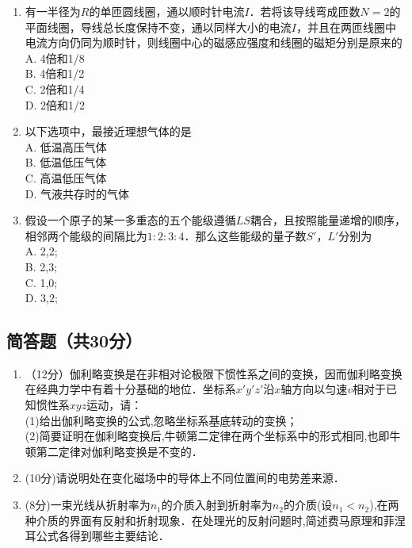\begin{enumerate}
\item 有一半径为$R$的单匝圆线圈，通以顺时针电流$I$．若将该导线弯成匝数$N=2$的平面线圈，导线总长度保持不变，通以同样大小的电流$I$，并且在两匝线圈中电流方向仍同为顺时针，则线圈中心的磁感应强度和线圈的磁矩分别是原来的\\
A. 4倍和1/8\\
B. 4倍和1/2\\
C. 2倍和1/4\\
D. 2倍和1/2\\

\item 以下选项中，最接近理想气体的是\\
A. 低温高压气体\\
B. 低温低压气体\\
C. 高温低压气体\\
D. 气液共存时的气体\\

\item 假设一个原子的某一多重态的五个能级遵循$LS$耦合，且按照能量递增的顺序，相邻两个能级的间隔比为$1:2:3:4$．那么这些能级的量子数$S'$，$L'$分别为\\
A. 2,2;\\
B. 2,3;\\
C. 1,0;\\
D. 3,2;\\
\end{enumerate}
\subsection{简答题（共30分）}
\begin{enumerate}
\item （12分）伽利略变换是在非相对论极限下惯性系之间的变换，因而伽利略变换在经典力学中有着十分基础的地位．坐标系$x'y'z'$沿$x$轴方向以匀速$v$相对于已知惯性系$xyz$运动，请：\\
(1)给出伽利略变换的公式,忽略坐标系基底转动的变换；\\
(2)简要证明在伽利略变换后,牛顿第二定律在两个坐标系中的形式相同,也即牛顿第二定律对伽利略变换是不变的．\\

\item (10分)请说明处在变化磁场中的导体上不同位置间的电势差来源．

\item (8分)一束光线从折射率为$n_{1}$的介质入射到折射率为$n_{2}$的介质(设$n_{1}<n_{2}$),在两种介质的界面有反射和折射现象．在处理光的反射问题时,简述费马原理和菲涅耳公式各得到哪些主要结论．
\end{enumerate}
